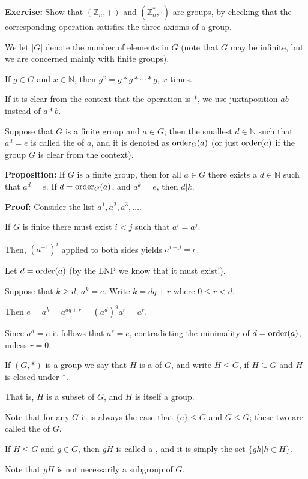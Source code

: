 \begin{frame}

{\bf Exercise:}
Show that $(\mathbb{Z}_n,+)$ and $(\mathbb{Z}_n^*,\cdot)$ are groups,
by checking that the corresponding operation satisfies the three
axioms of a group.

\end{frame}

\begin{frame}

We let $|G|$ denote the number of elements in $G$ (note that $G$ may
be infinite, but we are concerned mainly with finite groups).  

If $g\in G$ and $x\in\mathbb{N}$, then $g^x=g\ast g\ast\cdots\ast g$, $x$
times.  

If it is clear from the context that the operation is $\ast$,
we use juxtaposition $ab$ instead of $a\ast b$.


Suppose that $G$ is a finite group and $a\in G$; then the smallest
$d\in\mathbb{N}$ such that $a^d=e$ is called the 
 of $a$,
and it is denoted as $\mathrm{order}_G(a)$ (or just $\mathrm{order}(a)$ if the group
$G$ is clear from the context).

\end{frame}

\begin{frame}

{\bf Proposition:}
If $G$ is a finite group, then for all $a\in G$ there exists a
$d\in\mathbb{N}$ such that $a^d=e$.  If $d=\mathrm{order}_G(a)$, and
$a^k=e$, then $d|k$.


{\bf Proof:}
Consider the list $a^1,a^2,a^3,\ldots$.  

If $G$ is finite there must
exist $i<j$ such that $a^i=a^j$.  

Then, $(a^{-1})^i$ applied to both
sides yields $a^{i-j}=e$.  

Let $d=\mathrm{order}(a)$ (by the LNP we know that
it must exist!).  

Suppose that $k\ge d$, $a^k=e$.  Write $k=dq+r$
where $0\le r<d$.  

Then $e=a^k=a^{dq+r}=(a^d)^qa^r=a^r$.  

Since
$a^d=e$ it follows that $a^r=e$, contradicting the minimality of
$d=\mathrm{order}(a)$, unless $r=0$.

\end{frame}

\begin{frame}

If $(G,\ast)$ is a group we say that $H$ is a 
of $G$,
and write $H\le G$, if $H\subseteq G$ and $H$ is closed under $\ast$.

That is, $H$ is a subset of $G$, and $H$ is itself a group.  

Note that
for any $G$ it is always the case that $\{e\}\le G$ and $G\le G$;
these two are called the  of $G$.  

If $H\le G$
and $g\in G$, then $gH$ is called a , and it is
simply the set $\{gh|h\in H\}$.  

Note that $gH$ is not necessarily a
subgroup of $G$.

\end{frame}

